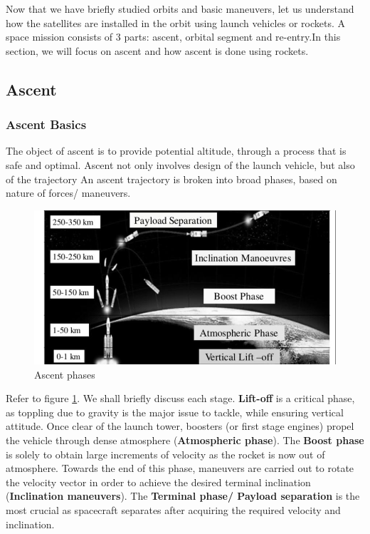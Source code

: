 \documentclass{article}
\theoremstyle{definition}
\begin{document}
Now that we have briefly studied orbits and basic maneuvers, let us understand how the satellites are installed in the orbit using launch vehicles or rockets.
A space mission consists of 3 parts: ascent, orbital segment and re-entry.In this section, we will focus on ascent and how ascent is done using rockets.

\subsection{Ascent}

\subsubsection{Ascent Basics}

The object of ascent is to provide potential altitude, through a process that is safe and optimal.
Ascent not only involves design of the launch vehicle, but also of the trajectory
An ascent trajectory is broken into broad phases, based on nature of forces/ maneuvers.

\begin{figure}[h]
    \centering
    \includegraphics[scale=0.3]{sos picture.jpg}
    \caption{Ascent phases}
    \label{fig:asc}
\end{figure}

Refer to figure \ref{fig:asc}. We shall briefly discuss each stage. \textbf{Lift-off} is a critical phase, as toppling due to gravity is the major issue to tackle, while ensuring vertical attitude.
Once clear of the launch tower, boosters (or first stage engines) propel the vehicle through dense atmosphere (\textbf{Atmospheric phase}).
The \textbf{Boost phase} is solely to obtain large increments of velocity as the rocket is now out of atmosphere. Towards the end of this phase, maneuvers are carried out to rotate the velocity vector in order to achieve the desired terminal inclination (\textbf{Inclination maneuvers}).
The \textbf{Terminal phase/ Payload separation} is the most crucial as spacecraft separates after acquiring the required velocity and inclination.
\end{document}
